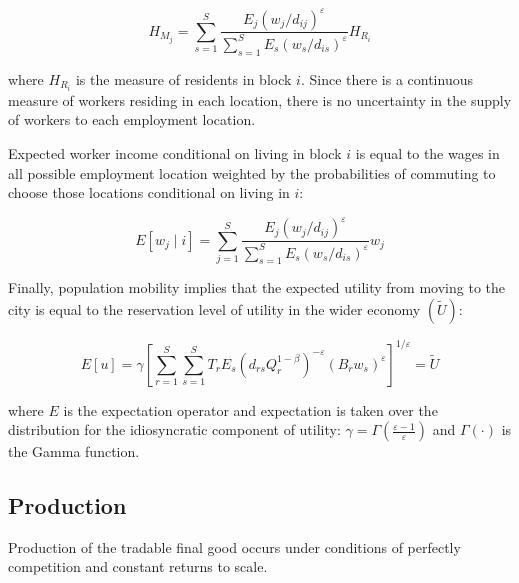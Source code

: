 \begin{equation}
  H_{M_j} = \sum_{s=1}^S \frac{E_j(w_j / d_{ij})^{\varepsilon}}{\sum_{s=1}^S E_s(w_s / d_{is})^{\varepsilon}} H_{R_i}
\end{equation}

where $H_{R_i}$ is the measure of residents in block $i$. Since there is a continuous measure of workers residing in each location, there is no uncertainty in the supply of workers to each employment location.

Expected worker income conditional on living in block $i$ is equal to the wages in all possible employment location weighted by the probabilities of commuting to choose those locations conditional on living in $i$:

\begin{equation}
  E[w_j \mid i] = \sum_{j=1}^S \frac{E_j(w_j / d_{ij})^\varepsilon}{\sum_{s=1}^S E_s(w_s / d_{is})^\varepsilon} w_j
\end{equation}

Finally, population mobility implies that the expected utility from moving to the city is equal to the reservation level of utility in the wider economy $(\tilde{U})$:

\begin{equation}
  E[u] = \gamma [\sum_{r=1}^S \sum_{s=1}^S T_r E_s(d_{rs} Q_r^{1-\beta})^{-\varepsilon} (B_r w_s)^{\varepsilon}]^{1/\varepsilon} = \tilde{U}
\end{equation}

where $E$ is the expectation operator and expectation is taken over the distribution for the idiosyncratic component of utility: $\gamma = \Gamma(\frac{\varepsilon - 1}{\varepsilon})$ and $\Gamma(\cdot)$ is the Gamma function.

\subsection{Production}

Production of the tradable final good occurs under conditions of perfectly competition and constant returns to scale.

